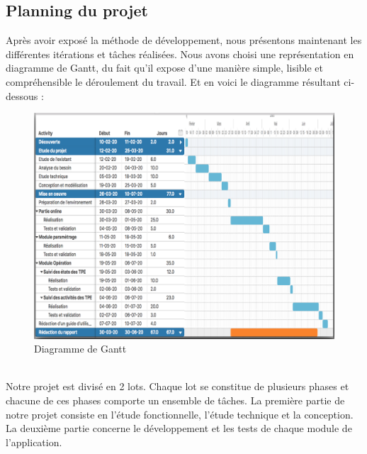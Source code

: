 \subsection{Planning du projet}
Après avoir exposé la méthode de développement, nous présentons maintenant les différentes itérations et tâches réalisées. Nous avons choisi une représentation en diagramme de Gantt, du fait qu’il expose d’une manière simple, lisible et compréhensible le déroulement du travail. Et en voici le diagramme résultant ci-dessous : 
\begin{figure}[h!]
 \centering
     \includegraphics[width=1\textwidth]{chapitre1/Figures/gantt1.png}
\caption{Diagramme de Gantt}
\end{figure}
\\
 Notre projet est divisé en 2 lots. Chaque lot se constitue de plusieurs phases et chacune de ces phases comporte un ensemble de tâches. La première partie de notre projet consiste en l’étude fonctionnelle, l'étude technique et la conception. La deuxième partie concerne le développement et les tests de chaque module de l'application.



